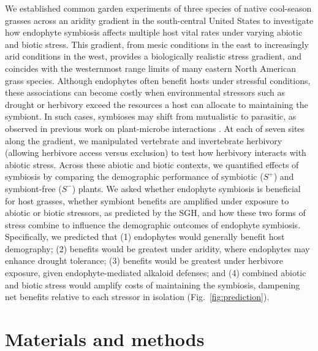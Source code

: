 \documentclass[12pt]{article}\usepackage[]{graphicx}\usepackage[dvipsnames]{xcolor}
\begin{document}
We established common garden experiments of three species of native cool-season grasses across an aridity gradient in the south-central United States to investigate how endophyte symbiosis affects multiple host vital rates under varying abiotic and biotic stress. 
This gradient, from mesic conditions in the east to increasingly arid conditions in the west, provides a biologically realistic stress gradient, and coincides with the westernmost range limits of many eastern North American grass species. 
Although endophytes often benefit hosts under stressful conditions, these associations can become costly when environmental stressors such as drought or herbivory exceed the resources a host can allocate to maintaining the symbiont. 
In such cases, symbioses may shift from mutualistic to parasitic, as observed in previous work on plant-microbe interactions \citep{johnson1997functioning}.
At each of seven sites along the gradient, we manipulated vertebrate and invertebrate herbivory (allowing herbivore access versus exclusion) to test how herbivory interacts with abiotic stress.
Across these abiotic and biotic contexts, we quantified effects of symbiosis by comparing the demographic performance of symbiotic ($S^+$) and  symbiont-free ($S^-$) plants. 
We asked whether endophyte symbiosis is beneficial for host grasses, whether symbiont benefits are amplified under exposure to abiotic or biotic stressors, as predicted by the SGH, and how these two forms of stress combine to influence the demographic outcomes of endophyte symbiosis.
Specifically, we predicted that (1) endophytes would generally benefit host demography; (2) benefits would be greatest under aridity, where endophytes may enhance drought tolerance; (3) benefits would be greatest under herbivore exposure, given endophyte-mediated alkaloid defenses; and (4) combined abiotic and biotic stress would amplify costs of maintaining the symbiosis, dampening net benefits relative to each stressor in isolation (Fig.~\ref{fig:prediction}).
\section*{Materials and methods}
\end{document}
